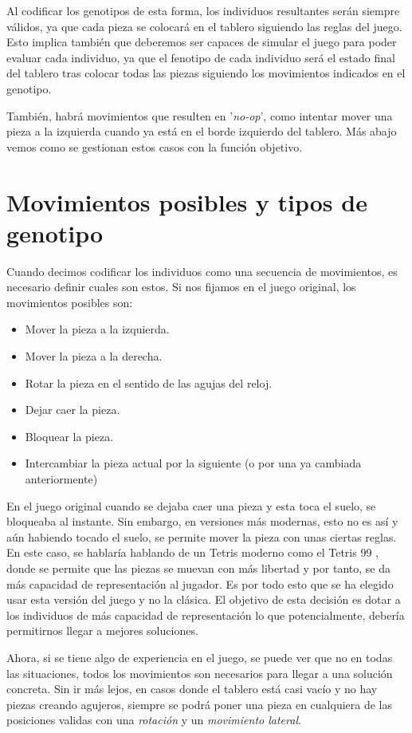 \documentclass[11pt,spanish,listoffigures,listoftables]{tfgetsinf}
\begin{document}
Al codificar los genotipos de esta forma, los individuos resultantes serán siempre válidos, ya que cada pieza se colocará en el tablero siguiendo las reglas del juego. Esto implica también que deberemos ser capaces de simular el juego para poder evaluar cada individuo, ya que el fenotipo de cada individuo será el estado final del tablero tras colocar todas las piezas siguiendo los movimientos indicados en el genotipo.

También, habrá movimientos que resulten en '\textit{no-op}', como intentar mover una pieza a la izquierda cuando ya está en el borde izquierdo del tablero. Más abajo vemos como se gestionan estos casos con la función objetivo.

\section{Movimientos posibles y tipos de genotipo}
Cuando decimos codificar los individuos como una secuencia de movimientos, es necesario definir cuales son estos. Si nos fijamos en el juego original, los movimientos posibles son:

\begin{itemize}
    \item Mover la pieza a la izquierda.
    \item Mover la pieza a la derecha.
    \item Rotar la pieza en el sentido de las agujas del reloj.
    \item Dejar caer la pieza.
    \item Bloquear la pieza.
    \item Intercambiar la pieza actual por la siguiente (o por una ya cambiada anteriormente)
\end{itemize}

En el juego original cuando se dejaba caer una pieza y esta toca el suelo, se bloqueaba al instante. Sin embargo, en versiones más modernas, esto no es así y aún habiendo tocado el suelo, se permite mover la pieza con unas ciertas reglas. En este caso, se hablaría hablando de un Tetris moderno como el Tetris 99 \cite{}, donde se permite que las piezas se muevan con más libertad y por tanto, se da más capacidad de representación al jugador. Es por todo esto que se ha elegido usar esta versión del juego y no la clásica. El objetivo de esta decisión es dotar a los individuos de más capacidad de representación lo que potencialmente, debería permitirnos llegar a mejores soluciones.

Ahora, si se tiene algo de experiencia en el juego, se puede ver que no en todas las situaciones, todos los movimientos son necesarios para llegar a una solución concreta. Sin ir más lejos, en casos donde el tablero está casi vacío y no hay piezas creando agujeros, siempre se podrá poner una pieza en cualquiera de las posiciones validas con una \textit{rotación} y un \textit{movimiento lateral}.
\end{document}
